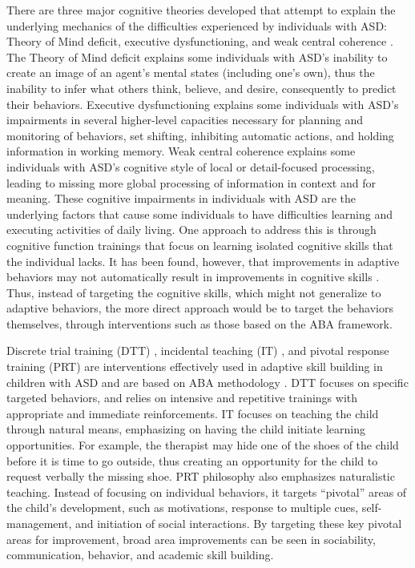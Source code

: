 There are three major cognitive theories developed that attempt to explain the underlying mechanics of the difficulties experienced by individuals with ASD: Theory of Mind deficit, executive dysfunctioning, and weak central coherence \cite{rajendran2007cognitive}.  The Theory of Mind deficit explains some individuals with ASD's inability to create an image of an agent's mental states (including one's own), thus the inability to infer what others think, believe, and desire, consequently to predict their behaviors.  Executive dysfunctioning explains some individuals with ASD's impairments in several higher-level capacities necessary for planning and monitoring of behaviors, set shifting, inhibiting automatic actions, and holding information in working memory.  Weak central coherence explains some individuals with ASD's cognitive style of local or detail-focused processing, leading to missing more global processing of information in context and for meaning.  These cognitive impairments in individuals with ASD are the underlying factors that cause some individuals to have difficulties learning and executing activities of daily living.  One approach to address this is through cognitive function trainings that focus on learning isolated cognitive skills that the individual lacks.  It has been found, however, that improvements in adaptive behaviors may not automatically result in improvements in cognitive skills \cite{chin2000teaching, teunisse2007cognitieve}.  Thus, instead of targeting the cognitive skills, which might not generalize to adaptive behaviors, the more direct approach would be to target the behaviors themselves, through interventions such as those based on the ABA framework.

Discrete trial training (DTT) \cite{howard2005comparison}, incidental teaching (IT) \cite{mcgee1986extension}, and pivotal response training (PRT) \cite{koegel2003teaching} are interventions effectively used in adaptive skill building in children with ASD and are based on ABA methodology \cite{palmen2013behavioral}.  DTT focuses on specific targeted behaviors, and relies on intensive and repetitive trainings with appropriate and immediate reinforcements.  IT focuses on teaching the child through natural means, emphasizing on having the child initiate learning opportunities.  For example, the therapist may hide one of the shoes of the child before it is time to go outside, thus creating an opportunity for the child to request verbally the missing shoe.  PRT philosophy also emphasizes naturalistic teaching.  Instead of focusing on individual behaviors, it targets ``pivotal'' areas of the child's development, such as motivations, response to multiple cues, self-management, and initiation of social interactions.  By targeting these key pivotal areas for improvement, broad area improvements can be seen in sociability, communication, behavior, and academic skill building.

